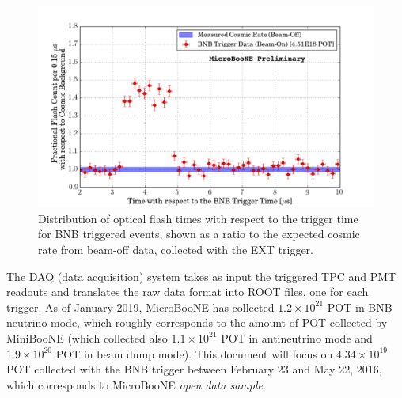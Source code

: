 \begin{figure}[htbp]
    \centering
    \includegraphics[width=0.85\linewidth]{figures/trigger.pdf}
    \caption{Distribution of optical flash times with respect to the trigger time for BNB triggered events, shown as a ratio to the expected cosmic rate from beam-off data, collected with the EXT trigger.}
    \label{fig:trigger}
\end{figure}

The DAQ (data acquisition) system takes as input the triggered TPC and PMT readouts and translates the raw data format into ROOT files, one for each trigger. As of January 2019, MicroBooNE has collected $1.2\times10^{21}$ POT in BNB neutrino mode, which roughly corresponds to the amount of POT collected by MiniBooNE (which collected also $1.1\times10^{21}$ POT in antineutrino mode and $1.9\times10^{20}$ POT in beam dump mode).
This document will focus on $4.34\times10^{19}$ POT collected with the BNB trigger between February 23 and May 22, 2016, which corresponds to MicroBooNE \emph{open data sample}. 